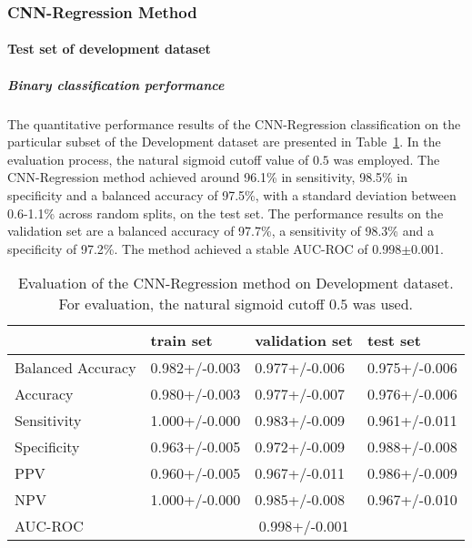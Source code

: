 \subsubsection{CNN-Regression Method}
\label{subsubsec:eval_regression}


\paragraph{Test set of development dataset}


\subparagraph{Binary classification performance}

The quantitative performance results of the CNN-Regression classification on the 
particular subset of the Development dataset are presented in Table~\ref{t1:cnn_regression_perf_eval_table}.
In the evaluation process, the natural sigmoid cutoff value of $0.5$ was employed.
The CNN-Regression method achieved around 96.1\% in sensitivity, 98.5\% in specificity and a balanced accuracy of 97.5\%, 
with a standard deviation between 0.6-1.1\% across random splits, on the test set.
The performance results on the validation set are a balanced accuracy of 97.7\%, a sensitivity of 98.3\% 
and a specificity of 97.2\%.
The method achieved a stable AUC-ROC of 0.998$\pm$0.001.


\begin{table}[ht]
  \caption{Evaluation of the CNN-Regression method on Development dataset. 
  For evaluation, the natural sigmoid cutoff $0.5$ was used.}
  \centering
  \begin{tabular}{llll}
      \hline
                        & train set         & validation set      & test set             \\
      \hline
      Balanced Accuracy & 0.982+/-0.003   &  0.977+/-0.006    &  0.975+/-0.006 \\
      Accuracy          & 0.980+/-0.003     &   0.977+/-0.007   &  0.976+/-0.006  \\
      Sensitivity       &  1.000+/-0.000   &   0.983+/-0.009   &  0.961+/-0.011 \\
      Specificity       &   0.963+/-0.005  &   0.972+/-0.009 &   0.988+/-0.008 \\
      PPV               &  0.960+/-0.005    &   0.967+/-0.011  &  0.986+/-0.009  \\
      NPV               &  1.000+/-0.000  &   0.985+/-0.008   & 0.967+/-0.010 \\
      \hline
      AUC-ROC          &  \multicolumn{3}{c}{0.998+/-0.001}  \\
      \hline
  \end{tabular}
 \label{t1:cnn_regression_perf_eval_table}
\end{table}


